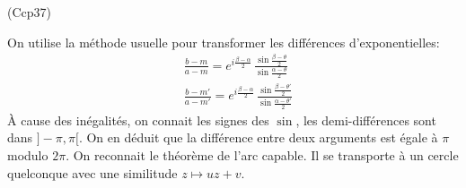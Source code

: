 \begin{tiny}(Ccp37)\end{tiny} On utilise la méthode usuelle pour transformer les différences d'exponentielles:
\begin{align*}
  &\frac{b-m}{a-m}   = e^{i\frac{\beta - \alpha}{2}}\,\frac{\sin\frac{\beta - \theta}{2}}{\sin\frac{\alpha - \theta}{2}} \\
  &\frac{b-m'}{a-m'} = e^{i\frac{\beta - \alpha}{2}}\,\frac{\sin\frac{\beta - \theta'}{2}}{\sin\frac{\alpha - \theta'}{2}}
\end{align*}
\`A cause des inégalités, on connait les signes des $\sin$, les demi-différences sont dans $]-\pi, \pi[$. On en déduit que la différence entre deux arguments est égale à $\pi$ modulo $2\pi$.\newline
On reconnait le théorème de l'arc capable. Il se transporte à un cercle quelconque avec une similitude $z\mapsto uz +v$.
